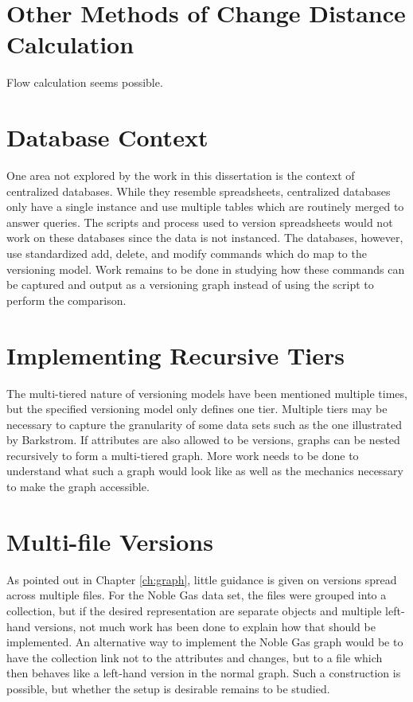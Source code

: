 \section{Other Methods of Change Distance Calculation}

Flow calculation seems possible.

\section{Database Context}

One area not explored by the work in this dissertation is the context of centralized databases.
While they resemble spreadsheets, centralized databases only have a single instance and use multiple tables which are routinely merged to answer queries.
The scripts and process used to version spreadsheets would not work on these databases since the data is not instanced.
The databases, however, use standardized add, delete, and modify commands which do map to the versioning model.
Work remains to be done in studying how these commands can be captured and output as a versioning graph instead of using the script to perform the comparison.

\section{Implementing Recursive Tiers}

The multi-tiered nature of versioning models have been mentioned multiple times, but the specified versioning model only defines one tier.
Multiple tiers may be necessary to capture the granularity of some data sets such as the one illustrated by Barkstrom.
If attributes are also allowed to be versions, graphs can be nested recursively to form a multi-tiered graph.
More work needs to be done to understand what such a graph would look like as well as the mechanics necessary to make the graph accessible.

\section{Multi-file Versions}

As pointed out in Chapter \ref{ch:graph}, little guidance is given on versions spread across multiple files.
For the Noble Gas data set, the files were grouped into a collection, but if the desired representation are separate objects and multiple left-hand versions, not much work has been done to explain how that should be implemented.
An alternative way to implement the Noble Gas graph would be to have the collection link not to the attributes and changes, but to a file which then behaves like a left-hand version in the normal graph.
Such a construction is possible, but whether the setup is desirable remains to be studied.

